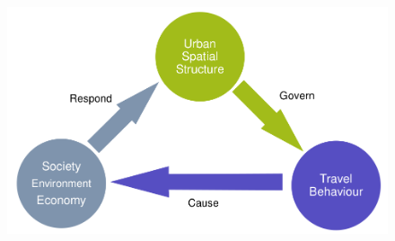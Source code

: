 \documentclass[aspectratio=169]{beamer}
\begin{document}
\begin{frame}
	
	\begin{figure}
		
		\includegraphics[width=0.94\linewidth]{images/big_links.png}
	\end{figure}
	
\end{frame}
\end{document}
